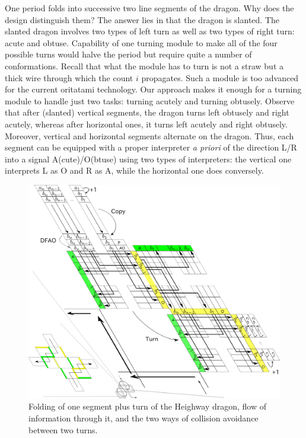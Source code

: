 One period folds into successive two line segments of the dragon. 
Why does the design distinguish them? 
The answer lies in that the dragon is slanted. 
The slanted dragon involves two types of left turn as well as two types of right turn: acute and obtuse. 
Capability of one turning module to make all of the four possible turns would halve the period but require quite a number of conformations. 
Recall that what the module has to turn is not a straw but a thick wire through which the count $i$ propagates. 
Such a module is too advanced for the current oritatami technology.  
Our approach makes it enough for a turning module to handle just two tasks: turning acutely and turning obtusely. 
Observe that after (slanted) vertical segments, the dragon turns left obtusely and right acutely, whereas after horizontal ones, it turns left acutely and right obtusely. 
Moreover, vertical and horizontal segments alternate on the dragon. 
Thus, each segment can be equipped with a proper interpreter \textit{a priori} of the direction L/R into a signal A(cute)/O(btuse) using two types of interpreters: the vertical one interprets L as O and R as A, while the horizontal one does conversely. 

\begin{figure}[tb]
\centering
\includegraphics[width=0.8\linewidth]{pic/dragon_vol5.png}
\caption{
Folding of one segment plus turn of the Heighway dragon, flow of information through it, and the two ways of collision avoidance between two turns.
}
\label{fig:abst_dragon}
\end{figure}

